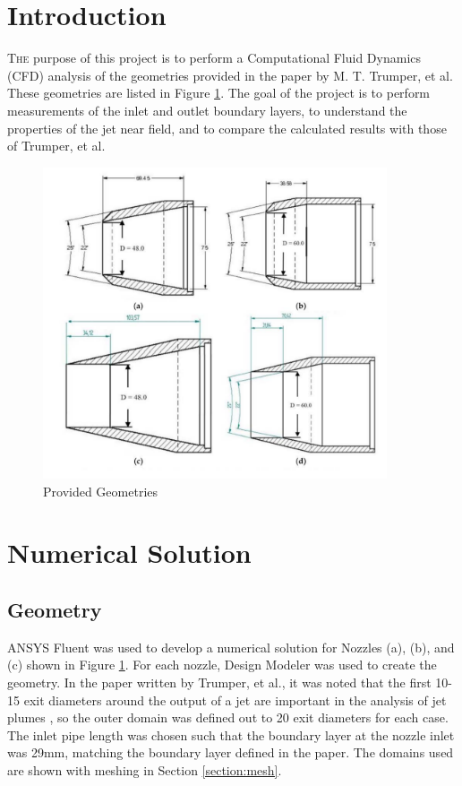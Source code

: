 \documentclass[12pt]{article} %
\begin{document}
\section{Introduction}
\lettrine{T}{he} purpose of this project is to perform a Computational Fluid Dynamics (CFD) analysis of the geometries provided in the paper by M. T. Trumper, et al. \cite{MilesT.Trumper2018IoNE} These geometries are listed in Figure \ref{fig:og_geometry}. The goal of the project is to perform measurements of the inlet and outlet boundary layers, to understand the properties of the jet near field, and to compare the calculated results with those of Trumper, et al.

\begin{figure}[ht]
    \centering
    \includegraphics[width = 4in]{OG_Geometry.PNG}
    \caption{Provided Geometries}
    \label{fig:og_geometry}
\end{figure}

\section{Numerical Solution}
\subsection{Geometry}
ANSYS Fluent was used to develop a numerical solution for Nozzles (a), (b), and (c) shown in Figure \ref{fig:og_geometry}. For each nozzle, Design Modeler was used to create the geometry. In the paper written by Trumper, et al., it was noted that the first 10-15 exit diameters around the output of a jet are important in the analysis of jet plumes \cite{MilesT.Trumper2018IoNE}, so the outer domain was defined out to 20 exit diameters for each case. The inlet pipe length was chosen such that the boundary layer at the nozzle inlet was 29mm, matching the boundary layer defined in the paper. The domains used are shown with meshing in Section \ref{section:mesh}.\par
\end{document}
